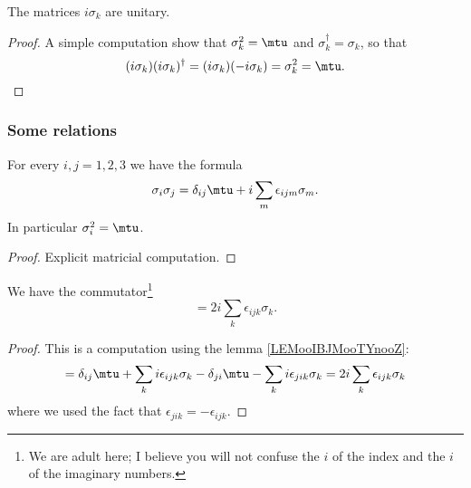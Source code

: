 \begin{lemma}
	The matrices \( i\sigma_k\) are unitary.
\end{lemma}

\begin{proof}
	A simple computation show that \( \sigma_k^2=\mtu\) and \( \sigma_k^{\dag}=\sigma_k\), so that
	\begin{equation}
		(i\sigma_k)(i\sigma_k)^{\dag}=(i\sigma_k)(-i\sigma_k)=\sigma_k^2=\mtu.
	\end{equation}
\end{proof}


\subsubsection{Some relations}

\begin{lemma}       \label{LEMooIBJMooTYnooZ}
	For every \( i,j=1,2,3\) we have the formula
	\begin{equation}
		\sigma_i\sigma_j=\delta_{ij}\mtu+i\sum_m\epsilon_{ijm}\sigma_m.
	\end{equation}
	In particular \( \sigma_i^2=\mtu\).
\end{lemma}

\begin{proof}
	Explicit matricial computation.
\end{proof}

\begin{lemma}       \label{LEMooJRWXooMkzRnk}
	We have the commutator\footnote{We are adult here; I believe you will not confuse the \( i\) of the index and the \( i\) of the imaginary numbers.}
	\begin{equation}
		[\sigma_i,\sigma_j]=2i\sum_k\epsilon_{ijk}\sigma_k.
	\end{equation}
\end{lemma}

\begin{proof}
	This is a computation using the lemma \ref{LEMooIBJMooTYnooZ}:
	\begin{equation}
		[\sigma_i,\sigma_j]=\delta_{ij}\mtu+\sum_ki\epsilon_{ijk}\sigma_k-\delta_{ji}\mtu-\sum_{k}i\epsilon_{jik}\sigma_k=2i\sum_k\epsilon_{ijk}\sigma_k
	\end{equation}
	where we used the fact that \( \epsilon_{jik}=-\epsilon_{ijk}\).
\end{proof}

